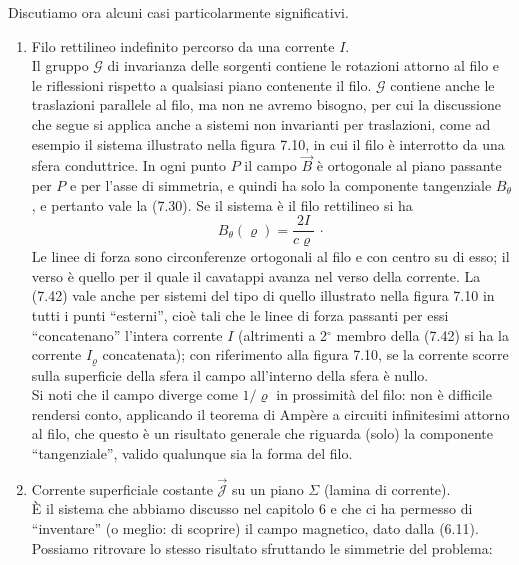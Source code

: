 Discutiamo ora alcuni casi particolarmente significativi.
\begin{enumerate}
  \item Filo rettilineo indefinito percorso da una corrente $I$.\\
    Il gruppo $\mathcal G$ di invarianza delle sorgenti contiene le rotazioni
    attorno al filo e le riflessioni rispetto a qualsiasi piano contenente il
    filo. $\mathcal G$ contiene anche le traslazioni parallele al filo, ma non
    ne avremo bisogno, per cui la discussione che segue si applica anche a
    sistemi non invarianti per traslazioni, come ad esempio il sistema
    illustrato nella figura 7.10, in cui il filo \`e interrotto da una sfera
    conduttrice.
    In ogni punto $P$ il campo $\vec B$ \`e ortogonale
    al piano passante per $P$ e per l'asse di simmetria, e quindi ha solo la
    componente tangenziale $B_\theta$, e pertanto vale la (7.30). Se il sistema
    \`e il filo rettilineo si ha
    \begin{equation}
      B_\theta(\varrho)=\frac{2I}{c\varrho}\,\cdot
      \tag{7.42}
    \end{equation}
    Le linee di forza sono circonferenze ortogonali al filo e con centro su di
    esso; il verso \`e quello per il quale il cavatappi avanza nel verso della
    corrente. La (7.42) vale anche per sistemi del tipo di quello illustrato
    nella figura 7.10 in tutti i punti ``esterni'', cio\`e tali che le linee di
    forza passanti per essi ``concatenano'' l'intera corrente $I$ (altrimenti a
    2$^\circ$ membro della (7.42) si ha la corrente $I_\varrho$ concatenata);
    con riferimento alla figura 7.10, se la corrente scorre sulla superficie
    della sfera il campo all'interno della sfera \`e nullo.\\
    Si noti che il campo diverge come $1/\varrho$ in prossimit\`a del filo: non
    \`e difficile rendersi conto, applicando il teorema di Amp\`ere a circuiti
    infinitesimi attorno al filo, che questo \`e un risultato generale che
    riguarda (solo) la componente ``tangenziale'', valido qualunque sia la forma
    del filo.
  \item Corrente superficiale costante $\vec{\mathcal J}$ su un piano $\Sigma$
    (lamina di corrente).\\
    \`E il sistema che abbiamo discusso nel capitolo 6 e che ci ha permesso di
    ``inventare'' (o meglio: di scoprire) il campo magnetico, dato dalla (6.11).
    Possiamo ritrovare lo stesso risultato sfruttando le simmetrie del problema:

\end{enumerate}

